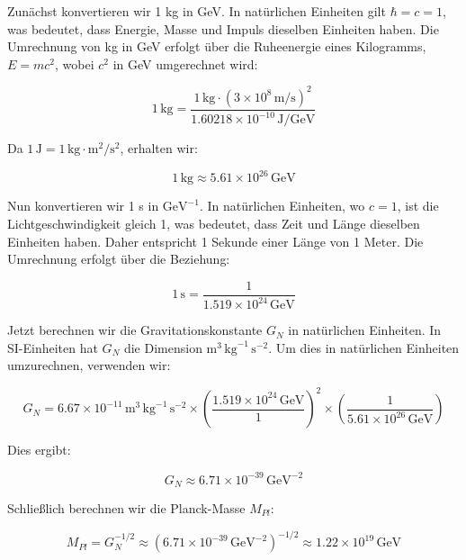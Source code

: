 Zunächst konvertieren wir 1 kg in GeV. In natürlichen Einheiten gilt $\hbar = c = 1$, was bedeutet, dass Energie, Masse und Impuls dieselben Einheiten haben. Die Umrechnung von kg in GeV erfolgt über die Ruheenergie eines Kilogramms, $E = mc^2$, wobei $c^2$ in GeV umgerechnet wird:

\[
1 \, \text{kg} = \frac{1 \, \text{kg} \cdot (3 \times 10^8 \, \text{m/s})^2}{1.60218 \times 10^{-10} \, \text{J/GeV}}
\]

Da $1 \, \text{J} = 1 \, \text{kg} \cdot \text{m}^2/\text{s}^2$, erhalten wir:

\[
1 \, \text{kg} \approx 5.61 \times 10^{26} \, \text{GeV}
\]

Nun konvertieren wir 1 s in $\mathrm{GeV}^{-1}$. In natürlichen Einheiten, wo $c = 1$, ist die Lichtgeschwindigkeit gleich 1, was bedeutet, dass Zeit und Länge dieselben Einheiten haben. Daher entspricht 1 Sekunde einer Länge von 1 Meter. Die Umrechnung erfolgt über die Beziehung:

\[
1 \, \text{s} = \frac{1}{1.519 \times 10^{24} \, \text{GeV}}
\]

Jetzt berechnen wir die Gravitationskonstante $G_N$ in natürlichen Einheiten. In SI-Einheiten hat $G_N$ die Dimension $\mathrm{m}^3 \, \mathrm{kg}^{-1} \, \mathrm{s}^{-2}$. Um dies in natürlichen Einheiten umzurechnen, verwenden wir:

\[
G_N = 6.67 \times 10^{-11} \, \mathrm{m}^3 \, \mathrm{kg}^{-1} \, \mathrm{s}^{-2} \times \left( \frac{1.519 \times 10^{24} \, \text{GeV}}{1} \right)^2 \times \left( \frac{1}{5.61 \times 10^{26} \, \text{GeV}} \right)
\]

Dies ergibt:

\[
G_N \approx 6.71 \times 10^{-39} \, \text{GeV}^{-2}
\]

Schließlich berechnen wir die Planck-Masse $M_{Pl}$:

\[
M_{Pl} = G_N^{-1/2} \approx (6.71 \times 10^{-39} \, \text{GeV}^{-2})^{-1/2} \approx 1.22 \times 10^{19} \, \text{GeV}
\]